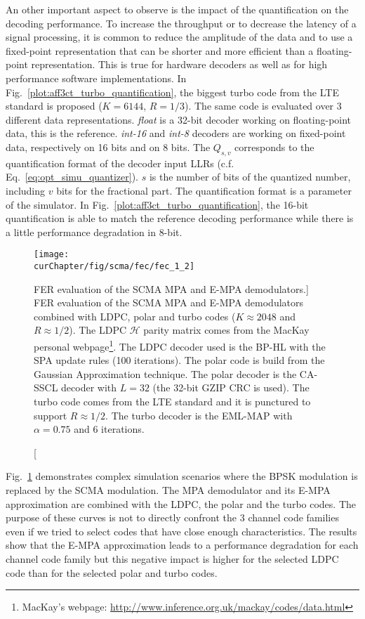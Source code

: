 An other important aspect to observe is the impact of the quantification on the
decoding performance. To increase the throughput or to decrease the latency of
a signal processing, it is common to reduce the amplitude of the data and to
use a fixed-point representation that can be shorter and more efficient than a
floating-point representation. This is true for hardware decoders as well as for
high performance software implementations. In
Fig.~\ref{plot:aff3ct_turbo_quantification}, the biggest turbo code from the LTE
standard is proposed ($K = 6144$, $R = 1/3$). The same code is evaluated over 3
different data representations. \emph{float} is a 32-bit decoder working on
floating-point data, this is the reference. \emph{int-16} and \emph{int-8}
decoders are working on fixed-point data, respectively on 16 bits and on 8 bits.
The $Q_{s,v}$ corresponds to the quantification format of the decoder input LLRs
(c.f. Eq.~\ref{eq:opt_simu_quantizer}). $s$ is the number of bits of the
quantized number, including $v$ bits for the fractional part. The quantification
format is a parameter of the \AFFECT simulator. In
Fig.~\ref{plot:aff3ct_turbo_quantification}, the 16-bit quantification is able
to match the reference decoding performance while there is a little performance
degradation in 8-bit.

\begin{figure}[htp]
  \centering
  \texttt{[image: \\curChapter/fig/scma/fec/fec\_1\_2]}
  \caption
    [FER evaluation of the SCMA MPA and E-MPA demodulators.]
    {FER evaluation of the SCMA MPA and E-MPA demodulators combined with LDPC,
     polar and turbo codes ($K \approx 2048$ and $R \approx 1/2$).
     The LDPC $\mathcal{H}$ parity matrix comes from the MacKay personal
     webpage\footnote{MacKay's webpage: \url{http://www.inference.org.uk/mackay/codes/data.html}}.
     The LDPC decoder used is the BP-HL with the SPA update rules (100
     iterations). The polar code is build from the Gaussian Approximation
     technique. The polar decoder is the CA-SSCL decoder with $L=32$ (the 32-bit
     GZIP CRC is used). The turbo code comes from the LTE standard and it is
     punctured to support $R \approx 1/2$. The turbo decoder is the EML-MAP with
     $\alpha = 0.75$ and 6 iterations.}
  \label{plot:aff3ct_scma_fec}
\end{figure}

Fig.~\ref{plot:aff3ct_scma_fec} demonstrates complex simulation scenarios where
the BPSK modulation is replaced by the SCMA modulation. The MPA demodulator and
its E-MPA approximation are combined with the LDPC, the polar and the turbo
codes. The purpose of these curves is not to directly confront the 3 channel
code families even if we tried to select codes that have close enough
characteristics. The results show that the E-MPA approximation leads to a
performance degradation for each channel code family but this negative impact is
higher for the selected LDPC code than for the selected polar and turbo codes.


